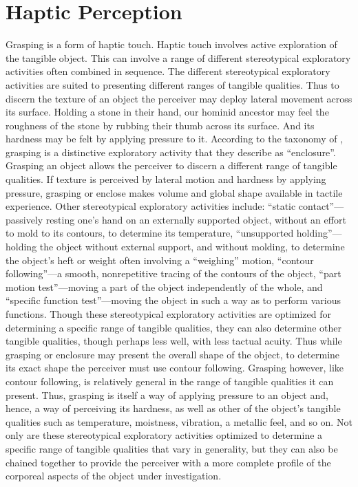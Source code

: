 
\section{Haptic Perception} %
\label{sec:haptic_perception}

Grasping is a form of haptic touch. Haptic touch involves active exploration of the tangible object. This can involve a range of different stereotypical exploratory activities often combined in sequence. The different stereotypical exploratory activities are suited to presenting different ranges of tangible qualities. Thus to discern the texture of an object the perceiver may deploy lateral movement across its surface. Holding a stone in their hand, our hominid ancestor may feel the roughness of the stone by rubbing their thumb across its surface. And its hardness may be felt by applying pressure to it. According to the taxonomy of \citet{Lederman:1987fr}, grasping is a distinctive exploratory activity that they describe as ``enclosure''. Grasping an object allows the perceiver to discern a different range of tangible qualities. If texture is perceived by lateral motion and hardness by applying pressure, grasping or enclose makes volume and global shape available in tactile experience. Other stereotypical exploratory activities include: ``static contact''---passively resting one's hand on an externally supported object, without an effort to mold to its contours, to determine its temperature, ``unsupported holding''---holding the object without external support, and without molding, to determine the object's heft or weight often involving a ``weighing'' motion, ``contour following''---a smooth, nonrepetitive tracing of the contours of the object, ``part motion test''---moving a part of the object independently of the whole, and ``specific function test''---moving the object in such a way as to perform various functions. Though these stereotypical exploratory activities are optimized for determining a specific range of tangible qualities, they can also determine other tangible qualities, though perhaps less well, with less tactual acuity. Thus while grasping or enclosure may present the overall shape of the object, to determine its exact shape the perceiver must use contour following. Grasping however, like contour following, is relatively general in the range of tangible qualities it can present. Thus, grasping is itself a way of applying pressure to an object and, hence, a way of perceiving its hardness, as well as other of the object's tangible qualities such as temperature, moistness, vibration, a metallic feel, and so on. Not only are these stereotypical exploratory activities optimized to determine a specific range of tangible qualities that vary in generality, but they can also be chained together to provide the perceiver with a more complete profile of the corporeal aspects of the object under investigation.


